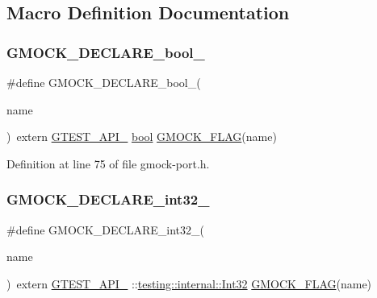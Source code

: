 \subsection{Macro Definition Documentation}
\mbox{\label{gmock-port_8h_a7a0a953221ea8ef5aaa6c644a48af599}} 
\subsubsection{\texorpdfstring{G\+M\+O\+C\+K\+\_\+\+D\+E\+C\+L\+A\+R\+E\+\_\+bool\+\_\+}{GMOCK\_DECLARE\_bool\_}}
{\footnotesize\ttfamily \#define G\+M\+O\+C\+K\+\_\+\+D\+E\+C\+L\+A\+R\+E\+\_\+bool\+\_\+(\begin{DoxyParamCaption}\item[{}]{name }\end{DoxyParamCaption})~extern \hyperlink{gtest-port_8h_aa73be6f0ba4a7456180a94904ce17790}{G\+T\+E\+S\+T\+\_\+\+A\+P\+I\+\_\+} \hyperlink{classbool}{bool} \hyperlink{gmock-port_8h_ad7119adfef06be5e7b1551633f5a1436}{G\+M\+O\+C\+K\+\_\+\+F\+L\+AG}(name)}



Definition at line 75 of file gmock-\/port.\+h.

\mbox{\label{gmock-port_8h_adeb7f0a8d842d1d541615763835af3f9}} 
\subsubsection{\texorpdfstring{G\+M\+O\+C\+K\+\_\+\+D\+E\+C\+L\+A\+R\+E\+\_\+int32\+\_\+}{GMOCK\_DECLARE\_int32\_}}
{\footnotesize\ttfamily \#define G\+M\+O\+C\+K\+\_\+\+D\+E\+C\+L\+A\+R\+E\+\_\+int32\+\_\+(\begin{DoxyParamCaption}\item[{}]{name }\end{DoxyParamCaption})~extern \hyperlink{gtest-port_8h_aa73be6f0ba4a7456180a94904ce17790}{G\+T\+E\+S\+T\+\_\+\+A\+P\+I\+\_\+} \+::\hyperlink{namespacetesting_1_1internal_a8ee38faaf875f133358abaf9bc056cec}{testing\+::internal\+::\+Int32} \hyperlink{gmock-port_8h_ad7119adfef06be5e7b1551633f5a1436}{G\+M\+O\+C\+K\+\_\+\+F\+L\+AG}(name)}



